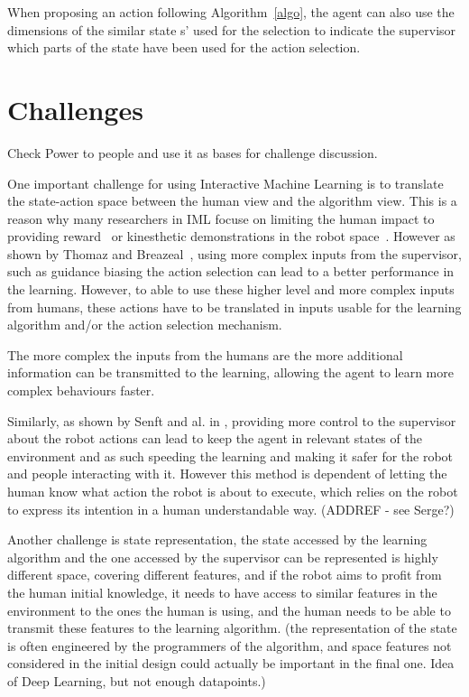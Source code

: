 \documentclass[letterpaper]{article} %
\begin{document}
When proposing an action following Algorithm~\ref{algo}, the agent can also use
the dimensions of the similar state s' used for the selection to indicate the
supervisor which parts of the state have been used for the action selection.

\section{Challenges}

Check Power to people and use it as bases for challenge discussion.

One important challenge for using Interactive Machine Learning is to translate the
state-action space between the human view and the algorithm view. This is a
reason why many researchers in IML focuse on limiting the human impact
to providing reward~\cite{knox2009interactively} or kinesthetic demonstrations
in the robot space~\cite{billard2008robot}. However as shown by Thomaz and Breazeal~\cite{thomaz2008teachable}, using more complex inputs from the supervisor, such
as guidance biasing the action selection can lead to a better performance in the
learning. However, to able to use these higher level and more complex inputs from
humans, these actions have to be translated in inputs usable for the learning
algorithm and/or the action selection mechanism. 

The more complex the inputs from the humans are the more additional information
can be transmitted to the learning, allowing the agent to learn more complex
behaviours faster.

Similarly, as shown by Senft and al. in \cite{senft2017supervised}, providing
more control to the supervisor about the robot actions can lead to keep the
agent in relevant states of the environment and as such speeding the learning
and making it safer for the robot and people interacting with it. However this
method is dependent of letting the human know what action the robot is about to
execute, which relies on the robot to express its intention in a human
understandable way. (ADDREF - see Serge?)

Another challenge is state representation, the state accessed by the learning
algorithm and the one accessed by the supervisor can be represented is highly
different space, covering different features, and if the robot aims to profit
from the human initial knowledge, it needs to have access to similar features in
the environment to the ones the human is using, and the human needs to be able
to transmit these features to the learning algorithm.
(the representation of the state is often engineered by the programmers of the
algorithm, and space features not considered in the initial design could
actually be important in the final one. Idea of Deep Learning, but not enough
datapoints.)
\end{document}
